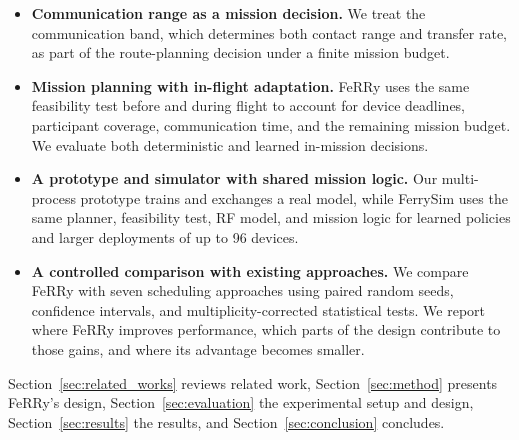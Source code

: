 \documentclass[conference]{IEEEtran}
\newcommand{\sysname}{FeRRy}
\begin{document}
\begin{itemize}

\item \textbf{Communication range as a mission decision.}
We treat the communication band, which determines both contact range and
transfer rate, as part of the route-planning decision under a finite mission
budget.

\item \textbf{Mission planning with in-flight adaptation.}
\sysname{} uses the same feasibility test before and during flight to account
for device deadlines, participant coverage, communication time, and the
remaining mission budget. We evaluate both deterministic and learned in-mission
decisions.

\item \textbf{A prototype and simulator with shared mission logic.}
Our multi-process prototype trains and exchanges a real model, while FerrySim
uses the same planner, feasibility test, RF model, and mission logic for learned
policies and larger deployments of up to 96 devices.

\item \textbf{A controlled comparison with existing approaches.}
We compare \sysname{} with seven scheduling approaches using paired random
seeds, confidence intervals, and multiplicity-corrected statistical tests. We
report where \sysname{} improves performance, which parts of the design
contribute to those gains, and where its advantage becomes smaller.


\end{itemize}

Section~\ref{sec:related_works} reviews related work,
Section~\ref{sec:method} presents \sysname{}'s design,
Section~\ref{sec:evaluation} the experimental setup and design,
Section~\ref{sec:results} the results, and Section~\ref{sec:conclusion}
concludes.


\newcommand{\cmarkc}{\cellcolor{goodgreen}\textcolor{black!55}{\scriptsize$\checkmark$}}
\newcommand{\xmarkc}{\cellcolor{badred}\textcolor{black!40}{\scriptsize$\times$}}
\newcommand{\tmarkc}{\cellcolor{nayellow}\textcolor{black!65}{\scriptsize$\triangle$}}
\newcommand{\cmarkF}{\cellcolor{ferrygreen}\textcolor{white}{\textbf{\scriptsize$\checkmark$}}}
\end{document}
